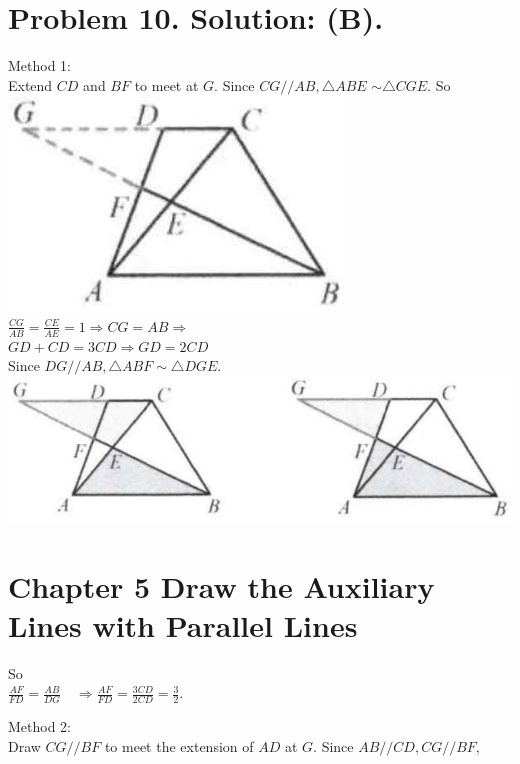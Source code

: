 \documentclass[10pt]{article}
\begin{document}
\section*{Problem 10. Solution: (B).}
Method 1:\\
Extend \(C D\) and \(B F\) to meet at \(G\). Since \(C G / / A B, \triangle A B E\) \(\sim \triangle C G E\). So\\
\includegraphics[max width=\textwidth, center]{2025_04_17_97bc1f7e44d93c271a88g-135}\\
\(\frac{C G}{A B}=\frac{C E}{A E}=1 \Rightarrow C G=A B \Rightarrow\)\\
\(G D+C D=3 C D \Rightarrow G D=2 C D\)\\
Since \(D G / / A B, \triangle A B F \sim \triangle D G E\).\\
\includegraphics[max width=\textwidth, center]{2025_04_17_97bc1f7e44d93c271a88g-135(1)}

\section*{Chapter 5 Draw the Auxiliary Lines with Parallel Lines}
So\\
\(\frac{A F}{F D}=\frac{A B}{D G} \quad \Rightarrow \frac{A F}{F D}=\frac{3 C D}{2 C D}=\frac{3}{2}\).

Method 2:\\
Draw \(C G / / B F\) to meet the extension of \(A D\) at \(G\). Since \(A B / / C D, C G / / B F\),
\end{document}
